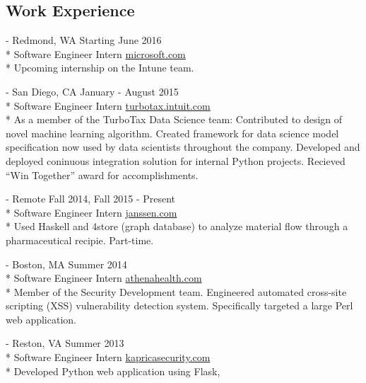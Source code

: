 \documentclass[letter,margin,line]{resume}
\newcommand{\rurl}[1]{\hfill {\footnotesize \url{#1}}}
\newcommand{\rdate}[1]{\hfill {\small #1}}
\renewcommand{\employer}[6]{\item[#1] - #2 \rdate{#3} \\* #4 \rurl{#5}\\* #6}
\begin{document}
\begin{resume}
        \section{\mysidestyle Work Experience}
        \begin{asparadesc}
            \employer{Microsoft}
                     {Redmond, WA}
                     {Starting June 2016}
                     {Software Engineer Intern}
                     {microsoft.com}
                     {
                         Upcoming internship on the Intune team.
                     }\\
            \employer{Intuit}
                     {San Diego, CA}
                     {January - August 2015}
                     {Software Engineer Intern}
                     {turbotax.intuit.com}
                     {
                     As a member of the TurboTax Data Science team:
                       Contributed to design of novel machine learning algorithm.
                       Created framework for data science model specification
                       now used by data scientists throughout the company.
                       Developed and deployed coninuous integration solution for
                       internal Python projects.
                       Recieved ``Win Together'' award for accomplishments.
                     }\\
            \employer{Janssen Pharmaceutical}
                     {Remote}
                     {Fall 2014, Fall 2015 - Present}
                     {Software Engineer Intern}
                     {janssen.com}
                     {Used Haskell and 4store (graph database) to analyze material 
                      flow through a pharmaceutical recipie. Part-time.}\\
            \employer{athenahealth}
                     {Boston, MA}
                     {Summer 2014}
                     {Software Engineer Intern}
                     {athenahealth.com}
                     {Member of the Security Development team.
                      Engineered automated cross-site scripting
                      (XSS) vulnerability detection system.
                      Specifically targeted a large Perl web application. 
                     }\\
            \employer{Kaprica Security}
                     {Reston, VA}
                     {Summer 2013}
                     {Software Engineer Intern}
                     {kapricasecurity.com}
                     {Developed Python web application using Flask,
}
\end{asparadesc}
\end{resume}
\end{document}
